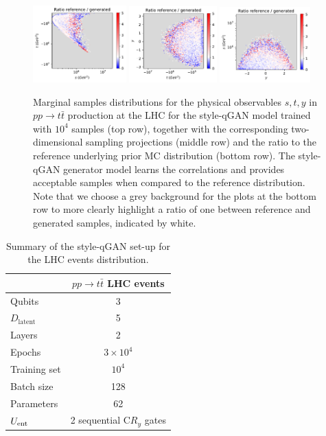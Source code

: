 \documentclass[twocolumn,preprintnumbers,superscriptaddress]{revtex4-2}
\begin{document}
\begin{figure}
  \includegraphics[width=0.32\textwidth]{plots/LHCttbar/s-t_RATIO_100k.pdf}%
  \includegraphics[width=0.3\textwidth]{plots/LHCttbar/t-y_RATIO_100k.pdf}%
  \includegraphics[width=0.31\textwidth]{plots/LHCttbar/y-s_RATIO_100k.pdf}


  \caption{\label{fig:ttbar}
    Marginal samples distributions for the physical observables $s,t,y$
    in $pp\rightarrow t\bar{t}$ production at the LHC for the style-qGAN model trained
    with $10^4$ samples (top row), together with the corresponding
    two-dimensional sampling projections (middle row) and the ratio to the reference underlying
    prior MC distribution (bottom row). The style-qGAN generator model learns the correlations and
    provides acceptable samples when compared to the reference distribution. Note that we choose
    a grey background for the plots at the bottom row to more clearly highlight a ratio of one between reference and generated samples, indicated by white.
}
\end{figure}

\begin{table}
  \begin{tabular}{l|c}
     & {\bf $pp \rightarrow t\bar{t}$ LHC events} \tabularnewline
    \hline
    Qubits & 3  \tabularnewline
    $D_{\mathrm{latent}}$ & 5 \tabularnewline
    Layers & 2  \tabularnewline
    Epochs & $3\times10^4$ \tabularnewline
    Training set & $10^4$ \tabularnewline
    Batch size & 128 \tabularnewline
    Parameters & 62 \tabularnewline
    $U_{\rm ent}$ & 2 sequential C$R_y$ gates \tabularnewline
    \hline
  \end{tabular}

  \caption{\label{table:summary_lhc} Summary of the style-qGAN set-up for the LHC events distribution.}
\end{table}
\end{document}
